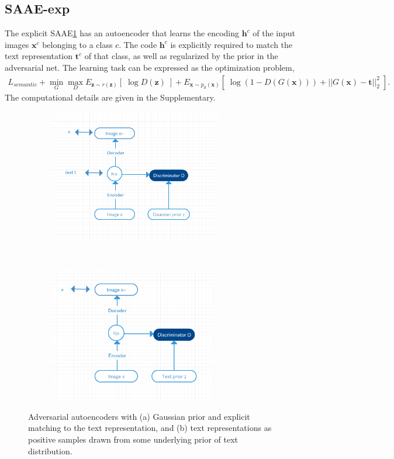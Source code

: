 \documentclass{article}
\newcommand{\bb}[1]{\boldsymbol{#1}}
\begin{document}

\subsection{SAAE-exp}
\label{subsec:NoisePrior}
	
	The explicit SAAE\ref{fig:Architecturea} has an autoencoder that learns the encoding $\bb{h}^c$ of the input images $\bb{x}^c$ belonging to a class $c$. The code $\bb{h}^c$ is explicitly required to match the text representation $\bb{t}^c$ of that class, as well as regularized by the prior in the adversarial net. The learning task can be expressed as the optimization problem,
	\begin{align}
   L_{semantic} + \min_{G} \max_D E_{\bb{z} \sim r(\bb{z})}\left[\; \log D(\bb{z}) \;\right] + E_{\bb{x} \sim p_d(\bb{x})}\left[\; \log( 1 - D(G(\bb{x})) ) + || G(\bb{x}) - \bb{t} ||_2^2 \;\right].
	\end{align}
	The computational details are given in the Supplementary.




\begin{figure}[hbt!]
    \centering
    \begin{subfigure}[t]{0.5\textwidth}
        \centering
        \includegraphics[height=2.30in]{fig1}
        \caption{}
            \label{fig:Architecturea}
    \end{subfigure}%
    ~ 
    \begin{subfigure}[t]{0.5\textwidth}
        \centering
        \includegraphics[height=2.30in]{fig2}
        \caption{}
                    \label{fig:Architectureb}
    \end{subfigure}
    \caption{Adversarial autoencoders with (a) Gaussian prior and explicit matching to the text representation, and (b) text representations as positive samples drawn from some underlying prior of text distribution.}
    \label{fig:Architecture}
\end{figure}
\end{document}
